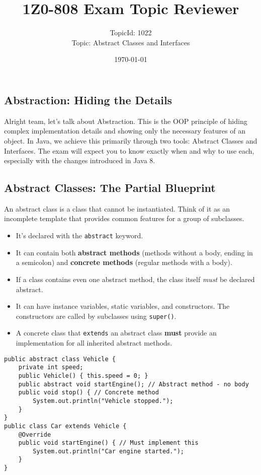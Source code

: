 \documentclass[12pt]{article}
\title{\textbf{1Z0-808 Exam Topic Reviewer}}
\author{TopicId: 1022 \\ Topic: Abstract Classes and Interfaces}
\date{\today}
\begin{document}
\maketitle
\newpage\begin{enumerate}[label=(\arabic*)]
\section*{Abstraction: Hiding the Details}
Alright team, let's talk about Abstraction. This is the OOP principle of hiding complex implementation details and showing only the necessary features of an object. In Java, we achieve this primarily through two tools: Abstract Classes and Interfaces. The exam will expect you to know exactly when and why to use each, especially with the changes introduced in Java 8.

\subsection{Abstract Classes: The Partial Blueprint}
An abstract class is a class that cannot be instantiated. Think of it as an incomplete template that provides common features for a group of subclasses.
\begin{itemize}
    \item It's declared with the \texttt{abstract} keyword.
    \item It can contain both \textbf{abstract methods} (methods without a body, ending in a semicolon) and \textbf{concrete methods} (regular methods with a body).
    \item If a class contains even one abstract method, the class itself \textit{must} be declared abstract.
    \item It can have instance variables, static variables, and constructors. The constructors are called by subclasses using \texttt{super()}.
    \item A concrete class that \texttt{extends} an abstract class \textbf{must} provide an implementation for all inherited abstract methods.
\end{itemize}
\begin{verbatim}
public abstract class Vehicle {
    private int speed;
    public Vehicle() { this.speed = 0; }
    public abstract void startEngine(); // Abstract method - no body
    public void stop() { // Concrete method
        System.out.println("Vehicle stopped.");
    }
}
public class Car extends Vehicle {
    @Override
    public void startEngine() { // Must implement this
        System.out.println("Car engine started.");
    }
}
\end{verbatim}


\end{enumerate}
\end{document}
